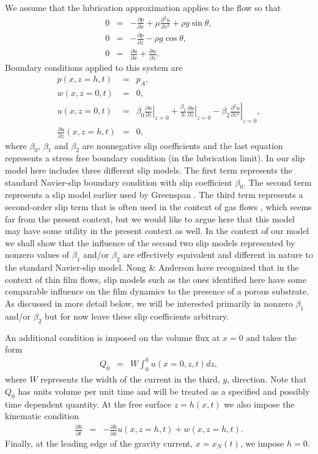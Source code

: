 \documentclass[11pt]{article}
\newcommand{\bea}{\begin{eqnarray}}
\newcommand{\eea}{\end{eqnarray}}
\begin{document}
We assume that the lubrication approximation applies to the flow so that
\bea
\label{eq:mom_x}
0 & = & - \frac{\partial p}{\partial x} + \mu \frac{\partial^2 u}{\partial z^2} + \rho g \sin \theta, \\
\label{eq:mom_z}
0 & = & - \frac{\partial p}{\partial z} - \rho g \cos \theta , \\
\label{eq:continuity}
0 & = & \frac{\partial u}{\partial x} + \frac{\partial w}{\partial z}.
\eea
Boundary conditions applied to this system are
\bea
\label{eq:bc1}
p(x,z=h,t) & = & p_A ,\\
\label{eq:bc2}
w(x,z=0,t) & = & 0,\\
\label{eq:bc3}
u(x,z=0,t) & = & \beta_0 \left. \frac{\partial u}{\partial z} \right|_{z=0}+ \frac{\beta_1}{h} \left. \frac{\partial u}{\partial z} \right|_{z=0}- \beta_2 \left. \frac{\partial^2 u}{\partial z^2}  \right|_{z=0}, \\
\label{eq:bc4}
\frac{\partial u}{\partial z} (x,z=h,t) & = & 0,
\eea
where $\beta_0$, $\beta_1$ and $\beta_2$ are nonnegative slip coefficients and the last equation represents a stress free boundary condition (in the lubrication limit).  
In our slip model here includes three different slip models.  The first term represents the standard Navier-slip boundary condition with slip coefficient $\beta_0$.
The second term represents a slip model earlier used by Greenspan \cite{Greenspan1978}.
The third term represents a second-order slip term that is often used in the context of gas flows \cite{H2003}, which seems far from the present context, but we would like to argue
here that this model may have some utility in the present context as well.  In the context of our model we shall show that the influence of the
second two slip models represented by nonzero values of $\beta_1$ and/or $\beta_2$ are effectively equivalent and different in nature to the standard Navier-slip model.  
Nong \& Anderson \cite{NA2010} have recognized that in the context of thin film flows, slip models such as the ones identified here have some comparable influence on the film 
dynamics to the presence of a porous substrate.
 As discussed in more detail below, we will be interested primarily in nonzero $\beta_1$ and/or $\beta_2$ but for now leave these slip coefficients arbitrary.  
  
 An additional condition is imposed on the volume flux at $x=0$ and takes the form
\bea
\label{eq:volume_flux}
Q_0 & = & W \int_{0}^{h} u(x=0,z,t) dz,
\eea
where $W$ represents the width of the current in the third, $y$, direction.  Note that $Q_0$ has units volume per unit time and will be treated as a specified and possibly time dependent 
quantity.  At the free surface $z=h(x,t)$ we also impose the kinematic condition
\bea
\label{eq:kinematic}
\frac{\partial h}{\partial t} & = & -\frac{\partial h}{\partial x} u(x,z=h,t) + w(x,z=h,t).
\eea
Finally, at the leading edge of the gravity current, $x=x_N(t)$, we impose $h=0$.
\end{document}
